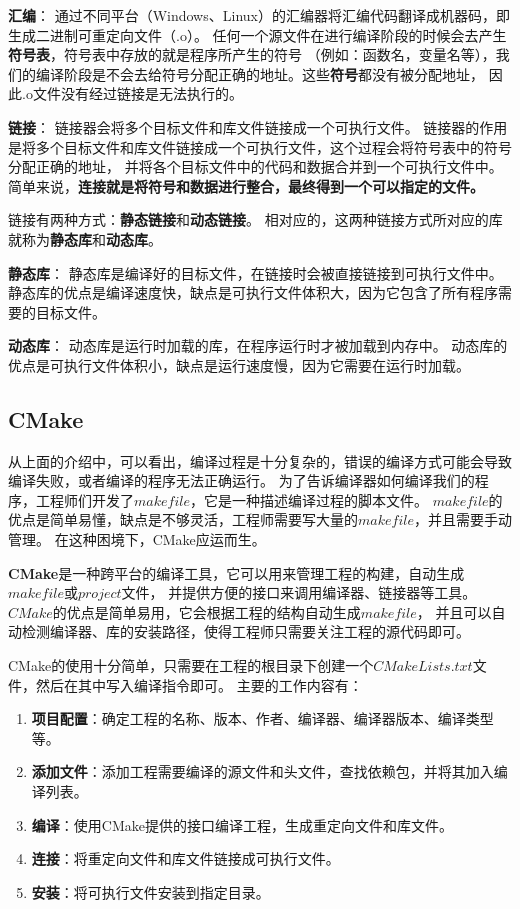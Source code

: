 \textbf{汇编}：
通过不同平台（Windows、Linux）的汇编器将汇编代码翻译成机器码，即生成二进制可重定向文件（.o）。
任何一个源文件在进行编译阶段的时候会去产生\textbf{符号表}，符号表中存放的就是程序所产生的符号
（例如：函数名，变量名等），我们的编译阶段是不会去给符号分配正确的地址。这些\textbf{符号}都没有被分配地址，
因此.o文件没有经过链接是无法执行的。

\textbf{链接}：
链接器会将多个目标文件和库文件链接成一个可执行文件。
链接器的作用是将多个目标文件和库文件链接成一个可执行文件，这个过程会将符号表中的符号分配正确的地址，
并将各个目标文件中的代码和数据合并到一个可执行文件中。
简单来说，\textbf{连接就是将符号和数据进行整合，最终得到一个可以指定的文件。}

链接有两种方式：\textbf{静态链接}和\textbf{动态链接}。
相对应的，这两种链接方式所对应的库就称为\textbf{静态库}和\textbf{动态库}。

\textbf{静态库}：
静态库是编译好的目标文件，在链接时会被直接链接到可执行文件中。
静态库的优点是编译速度快，缺点是可执行文件体积大，因为它包含了所有程序需要的目标文件。

\textbf{动态库}：
动态库是运行时加载的库，在程序运行时才被加载到内存中。
动态库的优点是可执行文件体积小，缺点是运行速度慢，因为它需要在运行时加载。

\subsection{CMake}
从上面的介绍中，可以看出，编译过程是十分复杂的，错误的编译方式可能会导致编译失败，或者编译的程序无法正确运行。
为了告诉编译器如何编译我们的程序，工程师们开发了$makefile$，它是一种描述编译过程的脚本文件。
$makefile$的优点是简单易懂，缺点是不够灵活，工程师需要写大量的$makefile$，并且需要手动管理。
在这种困境下，CMake应运而生。

\textbf{CMake}是一种跨平台的编译工具，它可以用来管理工程的构建，自动生成$makefile$或$project$文件，
并提供方便的接口来调用编译器、链接器等工具。$CMake$的优点是简单易用，它会根据工程的结构自动生成$makefile$，
并且可以自动检测编译器、库的安装路径，使得工程师只需要关注工程的源代码即可。

CMake的使用十分简单，只需要在工程的根目录下创建一个$CMakeLists.txt$文件，然后在其中写入编译指令即可。
主要的工作内容有：

\begin{enumerate}
    \item \textbf{项目配置}：确定工程的名称、版本、作者、编译器、编译器版本、编译类型等。
    \item \textbf{添加文件}：添加工程需要编译的源文件和头文件，查找依赖包，并将其加入编译列表。
    \item \textbf{编译}：使用CMake提供的接口编译工程，生成重定向文件和库文件。
    \item \textbf{连接}：将重定向文件和库文件链接成可执行文件。
    \item \textbf{安装}：将可执行文件安装到指定目录。
\end{enumerate}

